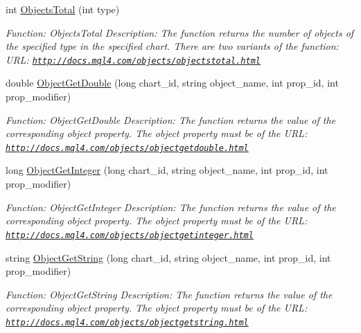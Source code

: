 \begin{DoxyCompactItemize}
int \hyperlink{class_m_q_l4_c_sharp_1_1_base_1_1_m_q_l_base_ab2856e671fe167427231f7f3e6d85a19}{Objects\+Total} (int type)
\begin{DoxyCompactList}\small\item\em Function\+: Objects\+Total Description\+: The function returns the number of objects of the specified type in the specified chart. There are two variants of the function\+: U\+RL\+: \href{http://docs.mql4.com/objects/objectstotal.html}{\tt http\+://docs.\+mql4.\+com/objects/objectstotal.\+html} \end{DoxyCompactList}\item 
double \hyperlink{class_m_q_l4_c_sharp_1_1_base_1_1_m_q_l_base_a24e86b112ce21420236a30de08f7c737}{Object\+Get\+Double} (long chart\+\_\+id, string object\+\_\+name, int prop\+\_\+id, int prop\+\_\+modifier)
\begin{DoxyCompactList}\small\item\em Function\+: Object\+Get\+Double Description\+: The function returns the value of the corresponding object property. The object property must be of the U\+RL\+: \href{http://docs.mql4.com/objects/objectgetdouble.html}{\tt http\+://docs.\+mql4.\+com/objects/objectgetdouble.\+html} \end{DoxyCompactList}\item 
long \hyperlink{class_m_q_l4_c_sharp_1_1_base_1_1_m_q_l_base_a9f0e0e912059857d34eb9fe7562ef480}{Object\+Get\+Integer} (long chart\+\_\+id, string object\+\_\+name, int prop\+\_\+id, int prop\+\_\+modifier)
\begin{DoxyCompactList}\small\item\em Function\+: Object\+Get\+Integer Description\+: The function returns the value of the corresponding object property. The object property must be of the U\+RL\+: \href{http://docs.mql4.com/objects/objectgetinteger.html}{\tt http\+://docs.\+mql4.\+com/objects/objectgetinteger.\+html} \end{DoxyCompactList}\item 
string \hyperlink{class_m_q_l4_c_sharp_1_1_base_1_1_m_q_l_base_a1df3843817955210cc27d004395768bb}{Object\+Get\+String} (long chart\+\_\+id, string object\+\_\+name, int prop\+\_\+id, int prop\+\_\+modifier)
\begin{DoxyCompactList}\small\item\em Function\+: Object\+Get\+String Description\+: The function returns the value of the corresponding object property. The object property must be of the U\+RL\+: \href{http://docs.mql4.com/objects/objectgetstring.html}{\tt http\+://docs.\+mql4.\+com/objects/objectgetstring.\+html} \end{DoxyCompactList}\item 

\end{DoxyCompactItemize}
